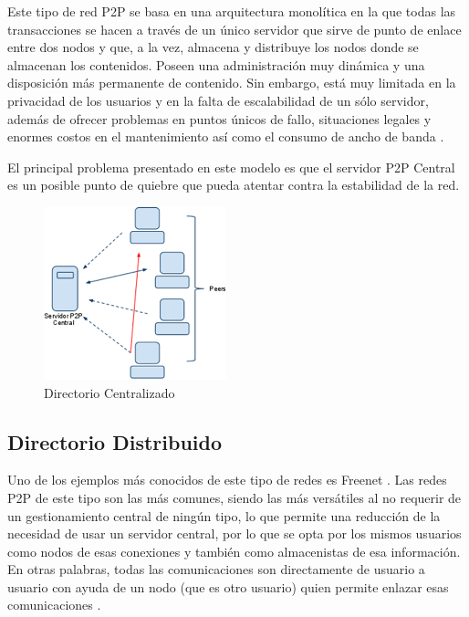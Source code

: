Este tipo de red P2P se basa en una arquitectura monolítica en la que todas las transacciones se hacen a través de un único servidor que sirve de punto de enlace entre dos nodos y que, a la vez, almacena y distribuye los nodos donde se almacenan los contenidos. Poseen una administración muy dinámica y una disposición más permanente de contenido. Sin embargo, está muy limitada en la privacidad de los usuarios y en la falta de escalabilidad de un sólo servidor, además de ofrecer problemas en puntos únicos de fallo, situaciones legales y enormes costos en el mantenimiento así como el consumo de ancho de banda \cite{wiki_p2p}.

El principal problema presentado en este modelo es que el servidor P2P Central es un posible punto de quiebre que pueda atentar contra la estabilidad de la red.

\begin{figure}[h]
  \centering
    \includegraphics[scale=1]{gfx/p2p_central}
  \caption{Directorio Centralizado}
  \label{conexionhttp}
\end{figure}


\subsection{Directorio Distribuido}

Uno de los ejemplos más conocidos de este tipo de redes es Freenet \cite{rfc4981}. Las redes P2P de este tipo son las más comunes, siendo las más versátiles al no requerir de un gestionamiento central de ningún tipo, lo que permite una reducción de la necesidad de usar un servidor central, por lo que se opta por los mismos usuarios como nodos de esas conexiones y también como almacenistas de esa información. En otras palabras, todas las comunicaciones son directamente de usuario a usuario con ayuda de un nodo (que es otro usuario) quien permite enlazar esas comunicaciones \cite{wiki_p2p}.

